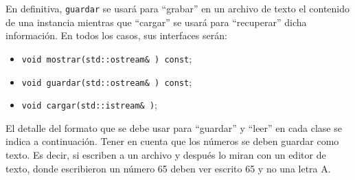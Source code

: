 \documentclass[spanish,a4paper]{article}
\begin{document}
En definitiva, \texttt{guardar} se usar\'a para ``grabar'' en un
archivo de texto el contenido de una instancia mientras que ``cargar''
se usar\'a para ``recuperar'' dicha informaci\'on. En todos los casos, sus
interfaces ser\'an:

\begin{itemize}
\item\verb|void mostrar(std::ostream& ) const|;
\item\verb|void guardar(std::ostream& ) const|;
\item\verb|void cargar(std::istream& )|;
\end{itemize}

El detalle del formato que se debe usar para ``guardar'' y ``leer'' en
cada clase se indica a continuaci\'on. Tener en cuenta que los n\'umeros
se deben guardar como texto. Es decir, si escriben a un archivo y
despu\'es lo miran con un editor de texto, donde escribieron un n\'umero
65 deben ver escrito 65 y no una letra A.
\end{document}
